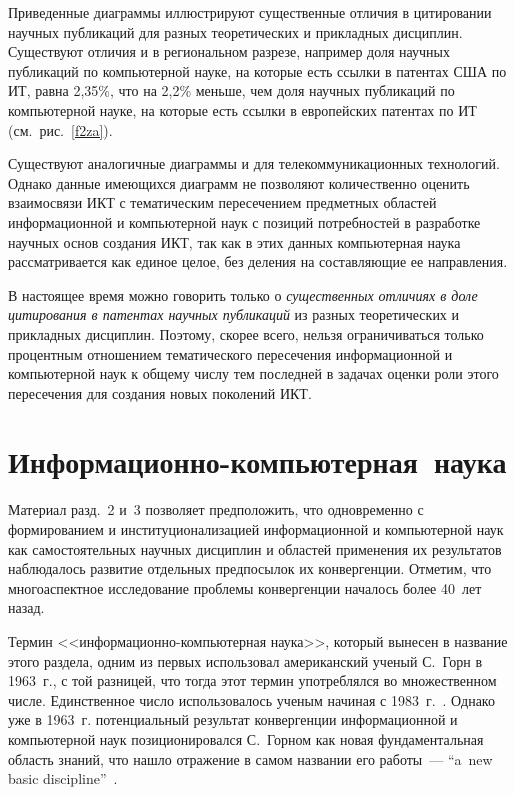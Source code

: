 \begin{multicols}{2}
      Приведенные диаграммы иллюстрируют существенные отличия в цитировании научных
публикаций для разных теоретических и прикладных дисциплин. Существуют отличия и в
региональном разрезе, например доля научных публикаций по компьютерной науке, на
которые есть ссылки в патентах США по ИТ, равна 2,35\%, что на 2,2\% меньше, чем доля
научных публикаций по компьютерной науке, на которые есть ссылки в европейских патентах
по ИТ (см.\ рис.~\ref{f2za}).

Существуют аналогичные диаграммы и для телекоммуникационных технологий. Однако
данные имеющихся диаграмм не позволяют количественно оценить взаимосвязи ИКТ с
тематическим пересечением предметных областей информационной и компьютерной наук с
позиций потребностей в разработке научных основ создания ИКТ, так как в этих данных
компьютерная наука рассматривается как единое целое, без деления на составляющие ее
направления.

      В настоящее время можно говорить только о \textit{существенных отличиях в доле
цитирования в патентах научных публикаций} из разных теоретических и прикладных
дисциплин. Поэтому, скорее всего, нельзя ограничиваться только процентным отношением
тематического пересечения информационной и компьютерной наук к общему числу тем
последней в задачах оценки роли этого пересечения для создания новых поколений ИКТ.

\section{Информационно-компьютерная~наука} %

      Материал разд.~2 и~3 позволяет предположить, что одновременно с формированием
и институционализацией информационной и компьютерной наук как самостоятельных научных
дисциплин и областей применения их результатов наблюдалось развитие отдельных
предпосылок их конвергенции. Отметим, что многоаспектное исследование проблемы
конвергенции началось более 40~лет назад.

Термин <<информационно-компьютерная наука>>, который вынесен в название этого
раздела, одним из первых использовал американский ученый С.~Горн в 1963~г., 
с той разницей, что тогда этот термин употреблялся во множественном чис\-ле. 
Единственное число использовалось ученым начиная с 1983~г.~\cite{12za}. Однако уже в 1963~г.
потенциальный результат конвергенции информационной и компьютерной наук
позиционировался С.~Горном как новая фундаментальная область знаний, что нашло
отражение в самом названии его работы~--- ``a~new basic discipline''~\cite{1za}.


\end{multicols}
